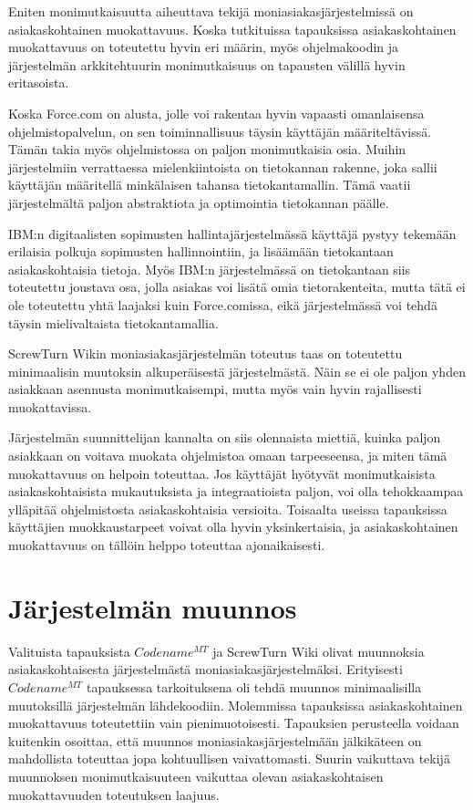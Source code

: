 Eniten monimutkaisuutta aiheuttava tekijä moniasiakasjärjestelmissä on asiakaskohtainen muokattavuus. Koska tutkituissa tapauksissa asiakaskohtainen muokattavuus on toteutettu hyvin eri määrin, myös ohjelmakoodin ja järjestelmän arkkitehtuurin monimutkaisuus on tapausten välillä hyvin eritasoista.

Koska Force.com on alusta, jolle voi rakentaa hyvin vapaasti omanlaisensa ohjelmistopalvelun, on sen toiminnallisuus täysin käyttäjän määriteltävissä. Tämän takia myös ohjelmistossa on paljon monimutkaisia osia. Muihin järjestelmiin verrattaessa mielenkiintoista on tietokannan rakenne, joka sallii käyttäjän määritellä minkälaisen tahansa tietokantamallin. Tämä vaatii järjestelmältä paljon abstraktiota ja optimointia tietokannan päälle.

IBM:n digitaalisten sopimusten hallintajärjestelmässä käyttäjä pystyy tekemään erilaisia polkuja sopimusten hallinnointiin, ja lisäämään tietokantaan asiakaskohtaisia tietoja. Myös IBM:n järjestelmässä on tietokantaan siis toteutettu joustava osa, jolla asiakas voi lisätä omia tietorakenteita, mutta tätä ei ole toteutettu yhtä laajaksi kuin Force.comissa, eikä järjestelmässä voi tehdä täysin mielivaltaista tietokantamallia.

ScrewTurn Wikin moniasiakasjärjestelmän toteutus taas on toteutettu minimaalisin muutoksin alkuperäisestä järjestelmästä. Näin se ei ole paljon yhden asiakkaan asennusta monimutkaisempi, mutta myös vain hyvin rajallisesti muokattavissa.

Järjestelmän suunnittelijan kannalta on siis olennaista miettiä, kuinka paljon asiakkaan on voitava muokata ohjelmistoa omaan tarpeeseensa, ja miten tämä muokattavuus on helpoin toteuttaa. Jos käyttäjät hyötyvät monimutkaisista asiakaskohtaisista mukautuksista ja integraatioista paljon, voi olla tehokkaampaa ylläpitää ohjelmistosta asiakaskohtaisia versioita. Toisaalta useissa tapauksissa käyttäjien muokkaustarpeet voivat olla hyvin yksinkertaisia, ja asiakaskohtainen muokattavuus on tällöin helppo toteuttaa ajonaikaisesti.

\section{Järjestelmän muunnos}

Valituista tapauksista $Codename^{MT}$ ja ScrewTurn Wiki olivat muunnoksia asiakaskohtaisesta järjestelmästä moniasiakasjärjestelmäksi. Erityisesti $Codename^{MT}$ tapauksessa tarkoituksena oli tehdä muunnos minimaalisilla muutoksillä järjestelmän lähdekoodiin. Molemmissa tapauksissa asiakaskohtainen muokattavuus toteutettiin  vain pienimuotoisesti. Tapauksien perusteella voidaan kuitenkin osoittaa, että muunnos moniasiakasjärjestelmään jälkikäteen on mahdollista toteuttaa jopa kohtuullisen vaivattomasti. Suurin vaikuttava tekijä muunnoksen monimutkaisuuteen vaikuttaa olevan asiakaskohtaisen muokattavuuden toteutuksen laajuus.

